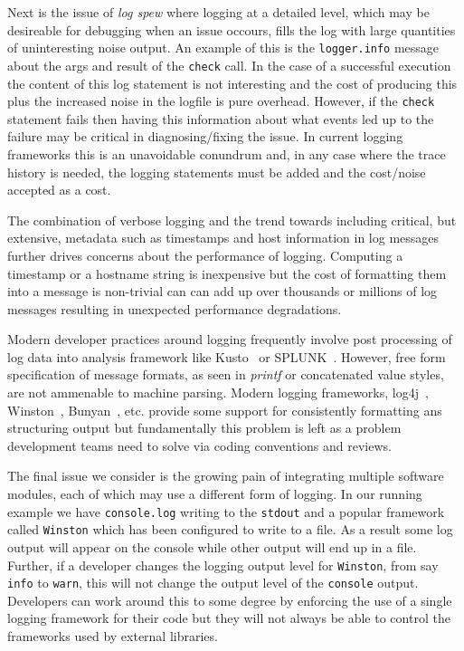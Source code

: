 \documentclass[sigplan,10pt,review]{acmart}
\begin{document}
Next is the issue of \emph{log spew} where logging at a detailed level, which 
may be desireable for debugging when an issue occours, fills the log with 
large quantities of uninteresting noise output. An example of this is the 
\texttt{logger.info} message about the args and result of the \texttt{check} 
call. In the case of a successful execution the content of this log statement 
is not interesting and the cost of producing this plus the increased noise in 
the logfile is pure overhead. However, if the \texttt{check} statement fails 
then having this information about what events led up to the failure may be 
critical in diagnosing/fixing the issue. In current logging frameworks this is 
an unavoidable conundrum and, in any case where the trace history is needed, 
the logging statements must be added and the cost/noise accepted as a cost.

The combination of verbose logging and the trend towards including critical, but 
extensive, metadata such as timestamps and host information in log messages further 
drives concerns about the performance of logging. Computing a timestamp or a 
hostname string is inexpensive but the cost of formatting them into a message is 
non-trivial can can add up over thousands or millions of log messages resulting 
in unexpected performance degradations. 

Modern developer practices around logging frequently involve post processing 
of log data into analysis framework like Kusto~\cite{} or SPLUNK~\cite{}. 
However, free form specification of message formats, as seen in \emph{printf} or 
concatenated value styles, are not ammenable to machine parsing. Modern logging 
frameworks, log4j~\cite{log4j}, Winston~\cite{Winston}, Bunyan~\cite{Bunyan}, etc. 
provide some support for consistently formatting ans structuring output but
fundamentally this problem is left as a problem development teams need to solve
via coding conventions and reviews.

The final issue we consider is the growing pain of integrating multiple software 
modules, each of which may use a different form of logging. In our running example 
we have \texttt{console.log} writing to the \texttt{stdout} and a
popular framework called \texttt{Winston} which has been configured to write to
a file. As a result some log output will appear on the console while other
output will end up in a file. Further, if a developer changes the logging output
level for \texttt{Winston}, from say \texttt{info} to \texttt{warn}, this will
not change the output level of the \texttt{console} output. Developers can work
around this to some degree by enforcing the use of a single logging framework
for their code but they will not always be able to control the frameworks used
by external libraries.
\end{document}
